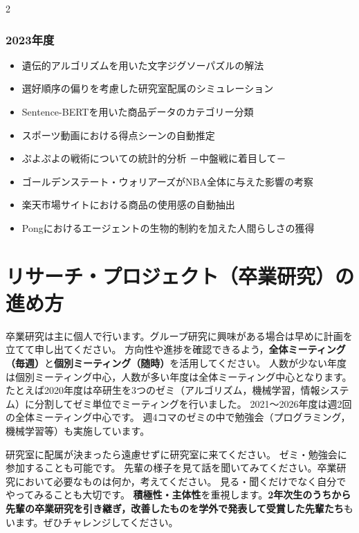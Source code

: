 \documentclass[paper=a4paper,fontsize=10.4pt]{jlreq}
\renewcommand{\emph}[1]{\textbf{#1}}
\begin{document}
\begin{tcolorbox}
\begin{multicols}{2}
\subsubsection*{2023年度}
\begin{itemize}[leftmargin=3mm]
  \item 遺伝的アルゴリズムを用いた文字ジグソーパズルの解法
  \item 選好順序の偏りを考慮した研究室配属のシミュレーション
  \item Sentence-BERTを用いた商品データのカテゴリー分類
  \item スポーツ動画における得点シーンの自動推定
  \item ぷよぷよの戦術についての統計的分析 －中盤戦に着目して－
  \item ゴールデンステート・ウォリアーズがNBA全体に与えた影響の考察
  \item 楽天市場サイトにおける商品の使用感の自動抽出
  \item Pongにおけるエージェントの生物的制約を加えた人間らしさの獲得
\end{itemize}
\end{multicols}
\end{tcolorbox}

\clearpage
\section{リサーチ・プロジェクト（卒業研究）の進め方}

卒業研究は主に個人で行います。グループ研究に興味がある場合は早めに計画を立てて申し出てください。
方向性や進捗を確認できるよう，\emph{全体ミーティング（毎週）}と\emph{個別ミーティング（随時）}を活用してください。
人数が少ない年度は個別ミーティング中心，人数が多い年度は全体ミーティング中心となります。
たとえば2020年度は卒研生を3つのゼミ（アルゴリズム，機械学習，情報システム）に分割してゼミ単位でミーティングを行いました。
2021～2026年度は週2回の全体ミーティング中心です。
週4コマのゼミの中で勉強会（プログラミング，機械学習等）も実施しています。

研究室に配属が決まったら遠慮せずに研究室に来てください。
ゼミ・勉強会に参加することも可能です。
先輩の様子を見て話を聞いてみてください。卒業研究において必要なものは何か，考えてください。
見る・聞くだけでなく自分でやってみることも大切です。
\emph{積極性・主体性}を重視します。\emph{2年次生のうちから先輩の卒業研究を引き継ぎ，改善したものを学外で発表して受賞した先輩たち}もいます。ぜひチャレンジしてください。
\end{document}
